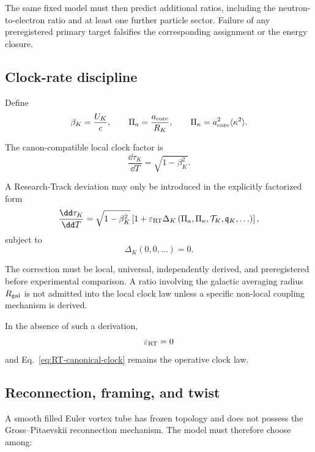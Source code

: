 The same fixed model must then predict additional ratios, including the
neutron-to-electron ratio and at least one further particle sector.  Failure
of any preregistered primary target falsifies the corresponding assignment
or the energy closure.

\subsection{Clock-rate discipline}

Define
\begin{equation}
\beta_K
=
\frac{U_K}{c},
\qquad
\Pi_a
=
\frac{a_{\rm core}}{R_K},
\qquad
\Pi_\kappa
=
a_{\rm core}^2\langle\kappa^2\rangle.
\label{eq:RT-clock-parameters}
\end{equation}

The canon-compatible local clock factor is
\begin{equation}
\frac{\dd\tau_K}{\dd T}
=
\sqrt{1-\beta_K^2}.
\label{eq:RT-canonical-clock}
\end{equation}

A Research-Track deviation may only be introduced in the explicitly
factorized form
\begin{equation}
\frac{\dd\tau_K}{\dd T}
=
\sqrt{1-\beta_K^2}
\left[
1+
\varepsilon_{\rm RT}
\Delta_K
\left(
\Pi_a,
\Pi_\kappa,
\mathcal{T}_K,
\mathfrak{q}_K,
\ldots
\right)
\right],
\label{eq:RT-clock-deviation}
\end{equation}
subject to
\begin{equation}
\Delta_K(0,0,\ldots)=0.
\end{equation}

The correction must be local, universal, independently derived, and
preregistered before experimental comparison.  A ratio involving the
galactic averaging radius \(R_{\rm gal}\) is not admitted into the local
clock law unless a specific non-local coupling mechanism is derived.

In the absence of such a derivation,
\begin{equation}
\varepsilon_{\rm RT}=0
\end{equation}
and Eq.~\eqref{eq:RT-canonical-clock} remains the operative clock law.

\subsection{Reconnection, framing, and twist}

A smooth filled Euler vortex tube has frozen topology and does not possess
the Gross--Pitaevskii reconnection mechanism.  The model must therefore
choose among:

